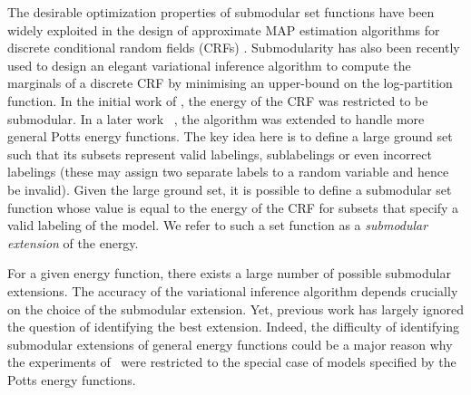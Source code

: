 The desirable optimization properties of submodular set functions have been
widely exploited in the design of approximate MAP estimation algorithms for
discrete conditional random fields (CRFs) \citep{boykov2001fast,
kumar2011improved}. Submodularity has also been recently used to design an
elegant variational inference algorithm to compute the marginals of a discrete
CRF by minimising an upper-bound on the log-partition function. In the initial
work of \citep{djolonga2014map}, the energy of the CRF was restricted to be submodular. In a later work ~\citep{zhang2015higher}, the algorithm was extended to handle more general Potts energy functions. The key idea here is to define a large ground set such that its subsets represent valid labelings, sublabelings or even incorrect labelings (these may assign two separate labels to a random variable and hence be invalid). Given the large ground set, it is possible to define a submodular set function whose value is equal to the energy of the CRF for subsets that specify a valid labeling of the model. We refer to such a set function as a {\em submodular extension} of the energy. 

For a given energy function, there exists a large number of possible submodular extensions. The accuracy of the variational inference algorithm depends crucially on the choice of the submodular extension. Yet, previous work has largely ignored the question of identifying the best extension. Indeed, the difficulty of identifying submodular extensions of general energy functions could be a major reason why the experiments of~\citep{zhang2015higher} were restricted to the special case of models specified by the Potts energy functions.

